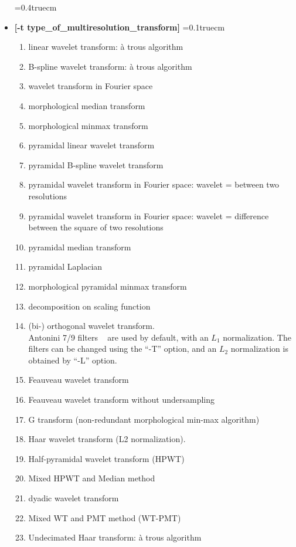 \begin{itemize} 
\baselineskip=0.4truecm
\item {\bf [-t type\_of\_multiresolution\_transform]}
\itemsep=0.1truecm
{\small 
\begin{enumerate}
\baselineskip=0.4truecm
\item linear wavelet transform: \`a trous algorithm 
\item B-spline wavelet transform: \`a trous algorithm 
\item wavelet transform in Fourier space 
\item morphological median transform 
\item morphological minmax transform 
\item pyramidal linear wavelet transform 
\item pyramidal B-spline wavelet transform 
\item pyramidal wavelet transform in Fourier space: 
                     wavelet =  between two resolutions 
\item  pyramidal wavelet transform in Fourier space: 
                     wavelet = difference between the square of two resolutions
\item  pyramidal median transform 
\item  pyramidal Laplacian 
\item  morphological pyramidal minmax transform 
\item  decomposition on scaling function 
\item  (bi-) orthogonal wavelet transform. \\ 
Antonini 7/9 filters ~\cite{wave:antonini92} are used by default, with an 
$L_1$ normalization. The filters can be changed using the ``-T'' option, and
an $L_2$ normalization is obtained by ``-L'' option.
\item  Feauveau wavelet transform 
\item  Feauveau wavelet transform without undersampling 
\item  G transform (non-redundant morphological min-max algorithm)
\item Haar wavelet transform (L2 normalization).
\item Half-pyramidal wavelet transform (HPWT)
\item Mixed HPWT and Median method
\item dyadic wavelet transform 
\item Mixed WT and PMT method (WT-PMT) 
\item Undecimated Haar transform: \`a trous algorithm

\end{enumerate}}
\end{itemize}
